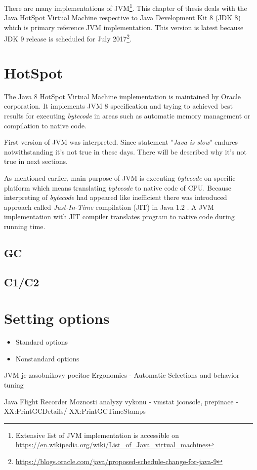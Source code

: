 \documentclass[
  digital, %
  oneside,
  notable, %
  nolof,     %
  nolot     %
]{fithesis3}
\begin{document}
There are many implementations of JVM\footnote{Extensive list of JVM implementation is accessible on \url{https://en.wikipedia.org/wiki/List_of_Java_virtual_machines}}. This chapter of thesis deals with the Java HotSpot Virtual Machine respective to Java Development Kit 8 (JDK 8) which is primary reference JVM implementation. This version is latest because JDK 9 release is scheduled for July 2017\footnote{\url{https://blogs.oracle.com/java/proposed-schedule-change-for-java-9}}.

\section{HotSpot}
The Java 8 HotSpot Virtual Machine implementation is maintained by Oracle corporation. It implements JVM 8 specification and trying to achieved best results for executing \textit{bytecode} in areas such as automatic memory management or compilation to native code.

First version of JVM was interpreted. Since statement "\textit{Java is slow}" endures notwithstanding it's not true in these days. There will be described why it's not true in next sections.

As mentioned earlier, main purpose of JVM is executing \textit{bytecode} on specific platform which means translating \textit{bytecode} to native code of CPU. Because interpreting of \textit{bytecode} had appeared like inefficient there was introduced approach called \textit{Just-In-Time} compilation (JIT) in Java 1.2 \cite{javavsc}. A JVM implementation with JIT compiler translates program to native code during running time.




\subsection{GC}
\subsection{C1/C2}


\section{Setting options}\cite{java}
\begin{itemize}
	\item Standard options
	\item Nonstandard options
\end{itemize}

JVM je zasobnikovy pocitac
Ergonomics - Automatic Selections and behavior tuning 

Java Flight Recorder
Moznosti analyzy vykonu - vmstat jconsole, prepinace -XX:PrintGCDetails/-XX:PrintGCTimeStamps





\end{document}
